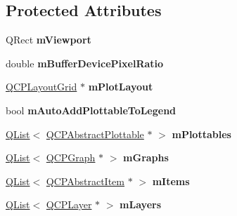 \subsection*{Protected Attributes}
\begin{DoxyCompactItemize}
\item 
\mbox{\label{class_q_custom_plot_ac0a7c38a715526c257cff95774f83ab6}} 
Q\+Rect {\bfseries m\+Viewport}
\item 
\mbox{\label{class_q_custom_plot_a63a40c57a2d89eea27b90b62cc4eee1f}} 
double {\bfseries m\+Buffer\+Device\+Pixel\+Ratio}
\item 
\mbox{\label{class_q_custom_plot_abbc71e86f5fbc20f50ca3dad2dec663c}} 
\hyperlink{class_q_c_p_layout_grid}{Q\+C\+P\+Layout\+Grid} $\ast$ {\bfseries m\+Plot\+Layout}
\item 
\mbox{\label{class_q_custom_plot_aaf3ea6a4cb04d35a149cc9a0cdac3394}} 
bool {\bfseries m\+Auto\+Add\+Plottable\+To\+Legend}
\item 
\mbox{\label{class_q_custom_plot_aac9fd7449c91296cce8fa6bd03258f09}} 
\hyperlink{class_q_list}{Q\+List}$<$ \hyperlink{class_q_c_p_abstract_plottable}{Q\+C\+P\+Abstract\+Plottable} $\ast$ $>$ {\bfseries m\+Plottables}
\item 
\mbox{\label{class_q_custom_plot_a125bf0974402c5ddc088fcd86988225c}} 
\hyperlink{class_q_list}{Q\+List}$<$ \hyperlink{class_q_c_p_graph}{Q\+C\+P\+Graph} $\ast$ $>$ {\bfseries m\+Graphs}
\item 
\mbox{\label{class_q_custom_plot_a778eaf240b1fef42060fad1775300182}} 
\hyperlink{class_q_list}{Q\+List}$<$ \hyperlink{class_q_c_p_abstract_item}{Q\+C\+P\+Abstract\+Item} $\ast$ $>$ {\bfseries m\+Items}
\item 
\mbox{\label{class_q_custom_plot_ad02f64f4164a002ea1fc055a85bb14e6}} 
\hyperlink{class_q_list}{Q\+List}$<$ \hyperlink{class_q_c_p_layer}{Q\+C\+P\+Layer} $\ast$ $>$ {\bfseries m\+Layers}
\item 
\mbox{\label{class_q_custom_plot_aa333200629256830e273873b582a5524}} 

\end{DoxyCompactItemize}
